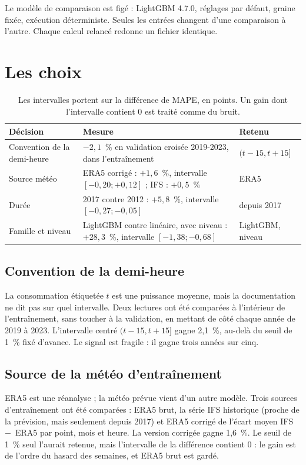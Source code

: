 \documentclass[11pt,a4paper]{article}
\begin{document}
Le modèle de comparaison est figé : LightGBM 4.7.0, réglages par défaut, graine fixée, exécution déterministe. Seules les entrées changent d'une comparaison à l'autre. Chaque calcul relancé redonne un fichier identique.

\section{Les choix}

\begin{table}[H]
\small
\begin{tabularx}{\linewidth}{lYl}
\toprule
\textbf{Décision} & \textbf{Mesure} & \textbf{Retenu} \\
\midrule
Convention de la demi-heure & $-2{,}1$~\% en validation croisée 2019-2023, dans l'entraînement & $(t-15, t+15]$ \\
Source météo & ERA5 corrigé : $+1{,}6$~\%, intervalle $[-0{,}20 ; +0{,}12]$ ; IFS : $+0{,}5$~\% & ERA5 \\
Durée & 2017 contre 2012 : $+5{,}8$~\%, intervalle $[-0{,}27 ; -0{,}05]$ & depuis 2017 \\
Famille et niveau & LightGBM contre linéaire, avec niveau : $+28{,}3$~\%, intervalle $[-1{,}38 ; -0{,}68]$ & LightGBM, niveau \\
\bottomrule
\end{tabularx}
\caption{Les intervalles portent sur la différence de MAPE, en points. Un gain dont l'intervalle contient 0 est traité comme du bruit.}
\end{table}

\subsection{Convention de la demi-heure}

La consommation étiquetée $t$ est une puissance moyenne, mais la documentation ne dit pas sur quel intervalle. Deux lectures ont été comparées à l'intérieur de l'entraînement, sans toucher à la validation, en mettant de côté chaque année de 2019 à 2023. L'intervalle centré $(t-15, t+15]$ gagne 2,1~\%, au-delà du seuil de 1~\% fixé d'avance. Le signal est fragile : il gagne trois années sur cinq.

\subsection{Source de la météo d'entraînement}

ERA5 est une réanalyse ; la météo prévue vient d'un autre modèle. Trois sources d'entraînement ont été comparées : ERA5 brut, la série IFS historique (proche de la prévision, mais seulement depuis 2017) et ERA5 corrigé de l'écart moyen IFS~$-$~ERA5 par point, mois et heure. La version corrigée gagne 1,6~\%. Le seuil de 1~\% seul l'aurait retenue, mais l'intervalle de la différence contient 0 : le gain est de l'ordre du hasard des semaines, et ERA5 brut est gardé.
\end{document}
